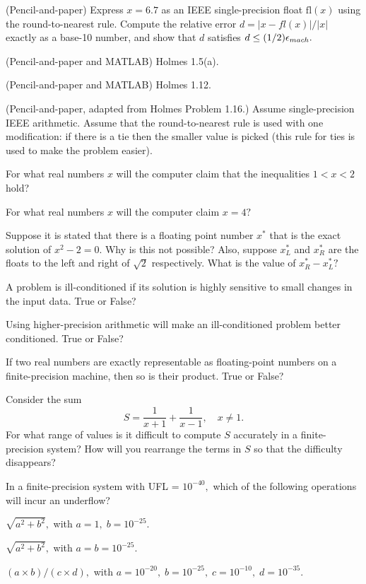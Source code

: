 \item (Pencil-and-paper)
Express $x=6.7$ as an IEEE single-precision float $\text{fl}(x)$ using the round-to-nearest rule.  Compute the relative error $d=|x-fl(x)|/|x|$ exactly as a base-10 number, and show that $d$ satisfies $d \le (1/2)\epsilon_{mach}.$


\item (Pencil-and-paper and MATLAB)
Holmes 1.5(a).

\item (Pencil-and-paper and MATLAB)
Holmes 1.12.

\item
(Pencil-and-paper, adapted from Holmes Problem 1.16.)  Assume single-precision IEEE arithmetic. Assume that the round-to-nearest rule is used with one modification: if there is a tie then the smaller value is picked (this rule for ties is used to make the problem easier).
\benum
\item For what real numbers $x$ will the computer claim that the inequalities $1 < x < 2$ hold?
\item For what real numbers $x$ will the computer claim $x = 4?$
\item Suppose it is stated that there is a floating point number $x^*$ that is the exact solution of
$x^2-2=0.$   Why is this not possible? Also, suppose $x^*_L$ and $x^*_R$ are the floats to the left and right of $\sqrt 2$ respectively.  What is the value of $x^*_R-x^*_L?$
\eenum

\item
\benum
\item A problem is ill-conditioned if its solution is highly sensitive to small changes in the input data.  True or False?
\item Using higher-precision arithmetic will make an ill-conditioned problem better conditioned.  True or False?
\item  If two real numbers are exactly representable as floating-point numbers on a finite-precision machine, then so is their product.  True or False?
\item  Consider the sum
\[
S = \frac{1}{x+1} + \frac{1}{x-1}, \quad x \ne 1.
\]
For what range of values is it difficult to compute $S$ accurately in a finite-precision system?  How will you rearrange the terms in $S$ so that the difficulty disappears?
\item In a finite-precision system with UFL = $10^{-40},$ which of the following operations will incur an underflow?
\benum
\item $\sqrt{a^2+b^2},$ with $a=1, \; b=10^{-25}.$
\item $\sqrt{a^2+b^2},$ with $a=b=10^{-25}.$
\item $(a\times b)/(c \times d),$ with $a=10^{-20}, \; b=10^{-25}, \; c=10^{-10}, \; d=10^{-35}.$
\eenum

\eenum

\eenum

